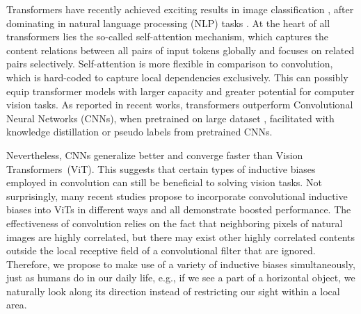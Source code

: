 \documentclass[authorversion, sigconf, acmthm=false, nonacm=true]{acmart}
\begin{document}
Transformers \cite{vaswani2017attention} have recently achieved exciting results in image classification \cite{dosovitskiy2021an, liu2021swin, yuan2021tokens, han2021transformer, chen2021crossvit, touvron2021training, dong2021cswin, yuan2021incorporating, dai2021coatnet, wu2021cvt, touvron2021going, zhou2021deepvit, jiang2021all, d'ascoli2021convit}, after dominating in natural language processing (NLP) tasks \cite{devlin2018bert, liu2019roberta, brown2020language}. 
At the heart of all transformers lies the so-called self-attention mechanism, which captures the content relations between all pairs of input tokens globally and focuses on related pairs selectively. 
Self-attention is more flexible in comparison to convolution, which is hard-coded to capture local dependencies exclusively. This can possibly equip transformer models with larger capacity and greater potential for computer vision tasks. 
As reported in recent works, transformers outperform Convolutional Neural Networks (CNNs), when pretrained on large dataset \cite{dosovitskiy2021an}, facilitated with knowledge distillation \cite{touvron2021training} or pseudo labels \cite{jiang2021all} from pretrained CNNs.


Nevertheless, CNNs generalize better and converge faster than Vision Transformers~(ViT). 
This suggests that certain types of inductive biases employed in convolution can still be beneficial to solving vision tasks.
Not surprisingly, many recent studies \cite{liu2021swin, dong2021cswin,yuan2021incorporating, dai2021coatnet, yuan2021tokens, wu2021cvt, graham2021levit,
touvron2021training, d'ascoli2021convit} propose to incorporate convolutional inductive biases into ViTs in different ways and all demonstrate
boosted performance. 
The effectiveness of convolution relies on the fact that neighboring pixels of natural images are highly correlated, 
but there may exist other highly correlated contents outside the local receptive field of a convolutional filter that are ignored. Therefore, we propose to 
make use of a variety of inductive biases simultaneously, just as humans do in our daily life, 
e.g., if we see a part of a horizontal object, we naturally look along its direction instead of restricting our sight within a local area. 
 
\end{document}

